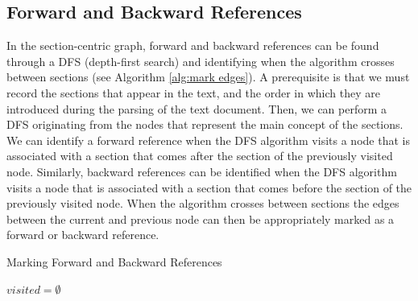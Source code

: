\documentclass[12pt]{article}
\begin{document}
\subsection{Forward and Backward References}
In the section-centric graph, forward and backward references can be found through a DFS (depth-first search) and identifying when the algorithm crosses between sections (see Algorithm \ref{alg:mark edges}). A prerequisite is that we must record the sections that appear in the text, and the order in which they are introduced during the parsing of the text document. Then, we can perform a DFS originating from the nodes that represent the main concept of the sections. We can identify a forward reference when the DFS algorithm visits a node that is associated with a section that comes after the section of the previously visited node. Similarly, backward references can be identified when the DFS algorithm visits a node that is associated with a section that comes before the section of the previously visited node. When the algorithm crosses between sections the edges between the current and previous node can then be appropriately marked as a forward or backward reference.

\DontPrintSemicolon

\begin{algorithm*}
    \caption{Marking Forward and Backward References}
    \label{alg:mark edges}
    \;
    $visited = \emptyset$\;
    \;
    \;
\end{algorithm*}
\end{document}
